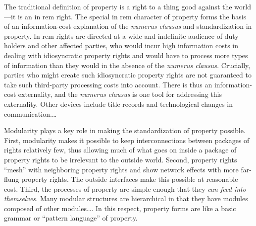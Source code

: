 The traditional definition of property is a right to a thing good against the
world---it is an in rem right. The special in rem character of property forms
the basis of an information-cost explanation of the \textit{numerus clausus
}and standardization in property. In rem rights are directed at a wide and
indefinite audience of duty holders and other affected parties, who would incur
high information costs in dealing with idiosyncratic property rights and would
have to process more types of information than they would in the absence of the
\textit{numerus clausus.} Crucially, parties who might create such
idiosyncratic property rights are not guaranteed to take such third-party
processing costs into account. There is thus an information-cost externality,
and the \textit{numerus clausus} is one tool for addressing this externality.
Other devices include title records and technological changes in
communication.\ldots

Modularity plays a key role in making the standardization of property possible.
First, modularity makes it possible to keep interconnections between packages
of rights relatively few, thus allowing much of what goes on inside a package
of property rights to be irrelevant to the outside world. Second, property
rights ``mesh'' with neighboring property rights and show network effects with
more far-flung property rights. The outside interfaces make this possible at
reasonable cost. Third, the processes of property are simple enough that they
\textit{can feed into themselves.} Many modular structures are hierarchical in
that they have modules composed of other modules\ldots . In this respect,
property forms are like a basic grammar or ``pattern language'' of property.

